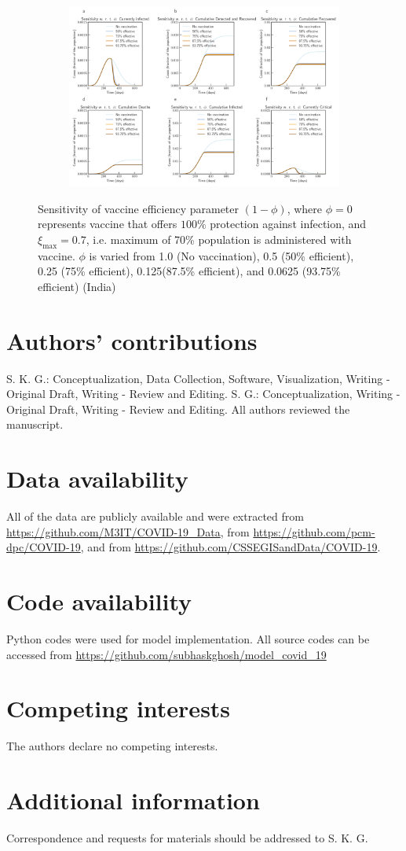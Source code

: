 \documentclass[10pt]{wlscirep}
\begin{document}
\begin{figure}[!htb]
	\centering
	\begin{subfigure}[b]{0.7\textwidth}
		\centering
		\includegraphics[width=1\linewidth]{India_scenario_vaccination0.7.pdf}
	\end{subfigure}
	\caption{Sensitivity of vaccine efficiency parameter $(1-\phi)$, where $\phi = 0$ represents vaccine that offers $100\%$ protection against infection, and $\xi_{\max} = 0.7$, i.e. maximum of 70\% population is administered with vaccine. $\phi$ is varied from 1.0 (No vaccination), 0.5 (50\% efficient), 0.25 (75\% efficient), 0.125(87.5\% efficient), and 0.0625 (93.75\% efficient) (India)}
	\label{fig9B} 
\end{figure}
%
%
\section*{Authors' contributions}
S. K. G.: Conceptualization, Data Collection, Software, Visualization, Writing - Original Draft, Writing - Review and Editing. S. G.: Conceptualization, Writing - Original Draft, Writing - Review and Editing. All authors reviewed the manuscript.

\section*{Data availability}
All of the data are publicly available and were extracted from \url{https://github.com/M3IT/COVID-19_Data}, from  \url{https://github.com/pcm-dpc/COVID-19}, and from \url{https://github.com/CSSEGISandData/COVID-19}.

\section*{Code availability}
Python codes were used for model implementation. All source codes can be accessed from \url{https://github.com/subhaskghosh/model_covid_19}

\section*{Competing interests}
The authors declare no competing interests.

\section*{Additional information}
Correspondence and requests for materials should be addressed to S. K. G.

	
\end{document}
